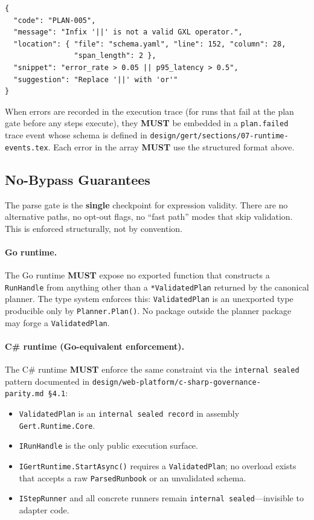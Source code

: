 \begin{verbatim}
{
  "code": "PLAN-005",
  "message": "Infix '||' is not a valid GXL operator.",
  "location": { "file": "schema.yaml", "line": 152, "column": 28,
                "span_length": 2 },
  "snippet": "error_rate > 0.05 || p95_latency > 0.5",
  "suggestion": "Replace '||' with 'or'"
}
\end{verbatim}

When errors are recorded in the execution trace (for runs that fail at the
plan gate before any steps execute), they \textbf{MUST} be embedded in a
\texttt{plan.failed} trace event whose schema is defined in
\texttt{design/gert/sections/07-runtime-events.tex}.  Each error in the array
\textbf{MUST} use the structured format above.

\subsection{No-Bypass Guarantees}
\label{sec:parse-gate:no-bypass}

The parse gate is the \textbf{single} checkpoint for expression validity.
There are no alternative paths, no opt-out flags, no ``fast path'' modes that
skip validation.  This is enforced structurally, not by convention.

\paragraph{Go runtime.}
The Go runtime \textbf{MUST} expose no exported function that constructs a
\texttt{RunHandle} from anything other than a \texttt{*ValidatedPlan} returned
by the canonical planner.  The type system enforces this: \texttt{ValidatedPlan}
is an unexported type producible only by \texttt{Planner.Plan()}.  No package
outside the planner package may forge a \texttt{ValidatedPlan}.

\paragraph{C\# runtime (Go-equivalent enforcement).}
The C\# runtime \textbf{MUST} enforce the same constraint via the
\texttt{internal sealed} pattern documented in
\texttt{design/web-platform/c-sharp-governance-parity.md~\S4.1}:

\begin{itemize}
  \item \texttt{ValidatedPlan} is an \texttt{internal sealed record} in
    assembly \texttt{Gert.Runtime.Core}.
  \item \texttt{IRunHandle} is the only public execution surface.
  \item \texttt{IGertRuntime.StartAsync()} requires a \texttt{ValidatedPlan};
    no overload exists that accepts a raw \texttt{ParsedRunbook} or an
    unvalidated schema.
  \item \texttt{IStepRunner} and all concrete runners remain
    \texttt{internal sealed}---invisible to adapter code.
\end{itemize}


